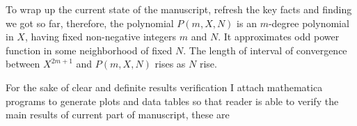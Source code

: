 To wrap up the current state of the manuscript, refresh the key facts and finding we got so far,
therefore, the polynomial $P(m,X,N)$ is an $m$-degree polynomial in $X$, having fixed non-negative
integers $m$ and $N$.
It approximates odd power function in some neighborhood of fixed $N$.
The length of interval of convergence between $X^{2m+1}$ and $P(m,X,N)$ rises as $N$ rise.

For the sake of clear and definite results verification I attach mathematica programs to generate
plots and data tables so that reader is able to verify the main results of current part of manuscript, these are
